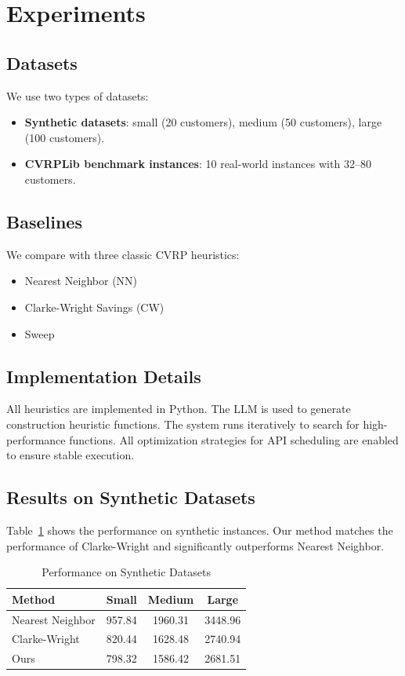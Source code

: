 \documentclass{article}
\begin{document}
\section{Experiments}

\subsection{Datasets}

We use two types of datasets:
\begin{itemize}
    \item \textbf{Synthetic datasets}: small (20 customers), medium (50 customers), large (100 customers).
    \item \textbf{CVRPLib benchmark instances}: 10 real-world instances with 32--80 customers.
\end{itemize}

\subsection{Baselines}

We compare with three classic CVRP heuristics:
\begin{itemize}
    \item Nearest Neighbor (NN)
    \item Clarke-Wright Savings (CW)
    \item Sweep
\end{itemize}

\subsection{Implementation Details}

All heuristics are implemented in Python. The LLM is used to generate construction heuristic functions. The system runs iteratively to search for high-performance functions. All optimization strategies for API scheduling are enabled to ensure stable execution.

\subsection{Results on Synthetic Datasets}

Table~\ref{tab:synthetic} shows the performance on synthetic instances. Our method matches the performance of Clarke-Wright and significantly outperforms Nearest Neighbor.

\begin{table}[h]
\centering
\caption{Performance on Synthetic Datasets}
\label{tab:synthetic}
\begin{tabular}{lccc}
\toprule
Method & Small & Medium & Large \\
\midrule
Nearest Neighbor & 957.84 & 1960.31 & 3448.96 \\
Clarke-Wright & 820.44 & 1628.48 & 2740.94 \\
Ours & 798.32 & 1586.42 & 2681.51 \\
\bottomrule
\end{tabular}
\end{table}
\end{document}
